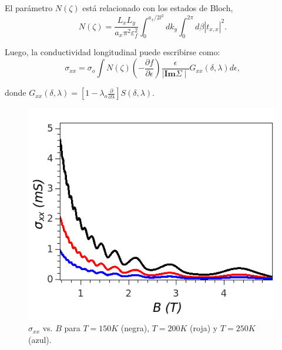 \begin{frame}
  El parámetro $N(\zeta)$ está relacionado con los estados de Bloch,
  \begin{equation}
    N(\zeta)=\frac{L_{x}L_{y}}{a_{x}\pi^{2} \varepsilon_{f}^{2}}\int_{0}^{a_{x}/2l^{2}}dk_{y} \int_{0}^{2\pi}d\beta|t_{x,x}|^{2}.
  \end{equation}

  Luego, la conductividad longitudinal puede escribirse como:
  \begin{equation}
    \sigma_{xx}=\sigma_{o}\int  N(\zeta)\left(-\frac{\partial f}{\partial\epsilon}\right)\frac{\epsilon}{\mid \textbf{Im}\Sigma\mid}G_{xx}(\delta,\lambda)d\epsilon,
    \label{condxx}
  \end{equation}

  donde $G_{xx}(\delta,\lambda)=\left[ 1-\lambda_{o}\frac{\partial }{\partial\lambda}\right] S(\delta,\lambda)$.
\end{frame}

\begin{frame}
  \begin{figure}[h!]
    \begin{center}
      \includegraphics[scale=0.5]{graficas/fig5.png}
      \caption{$\sigma_{xx}$ vs. $B$ para $T = 150 K$ (negra), $T = 200 K$ (roja) y $T = 250 K$ (azul).}
      \label{sigmavsB}
      \centering
    \end{center}
  \end{figure}
\end{frame}

